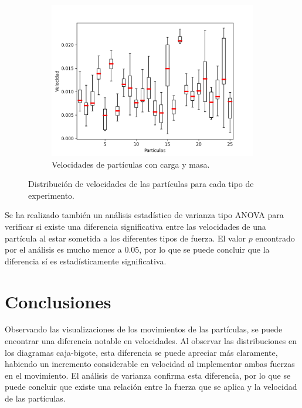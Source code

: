 \documentclass{report}
\begin{document}
\begin{figure}[h]
\begin{subfigure}[b]{0.49\textwidth}
         \centering
         \includegraphics[width=\textwidth]{Images/p9pmc.png}
         \caption{Velocidades de part\'iculas con carga y masa.}
         \label{fig:mascar}
    \end{subfigure}
    \caption{Distribuci\'on de velocidades de las part\'iculas para cada tipo de experimento.}
    \label{fig4}
\end{figure}

Se ha realizado tambi\'en un an\'alisis estad\'istico de varianza tipo ANOVA para verificar si existe una diferencia significativa entre las velocidades de una part\'icula al estar sometida a los diferentes tipos de fuerza. El valor $p$ encontrado por el an\'alisis es mucho menor a 0.05, por lo que se puede concluir que la diferencia s\'i es estad\'isticamente significativa.

\newpage

\section{Conclusiones}

Observando las visualizaciones de los movimientos de las part\'iculas, se puede encontrar una diferencia notable en velocidades. Al observar las distribuciones en los diagramas caja-bigote, esta diferencia se puede apreciar m\'as claramente, habiendo un incremento considerable en velocidad al implementar ambas fuerzas en el movimiento. El an\'alisis de varianza confirma esta diferencia, por lo que se puede concluir que existe una relaci\'on entre la fuerza que se aplica y la velocidad de las part\'iculas.
\end{document}

